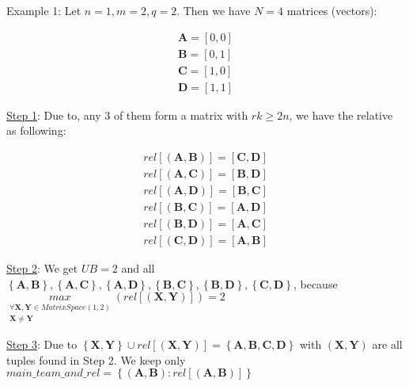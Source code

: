 Example 1: Let $n=1,m=2,q=2$. Then we have $N=4$ matrices (vectors):

\[
\begin{array}{c}
\boldsymbol{A}=[0,0]\\
\boldsymbol{B}=[0,1]\\
\boldsymbol{C}=[1,0]\\
\boldsymbol{D}=[1,1]
\end{array}
\]

\uline{Step 1}: Due to, any 3 of them form a matrix with $rk\geq2n$,
we have the relative as following:

\[
\begin{array}{c}
rel\left[\left(\boldsymbol{A},\boldsymbol{B}\right)\right]=[\boldsymbol{C},\boldsymbol{D}]\\
rel\left[\left(\boldsymbol{A},\boldsymbol{C}\right)\right]=[\boldsymbol{B},\boldsymbol{D}]\\
rel\left[\left(\boldsymbol{A},\boldsymbol{D}\right)\right]=[\boldsymbol{B},\boldsymbol{C}]\\
rel\left[\left(\boldsymbol{B},\boldsymbol{C}\right)\right]=[\boldsymbol{A},\boldsymbol{D}]\\
rel\left[\left(\boldsymbol{B},\boldsymbol{D}\right)\right]=[\boldsymbol{A},\boldsymbol{C}]\\
rel\left[\left(\boldsymbol{C},\boldsymbol{D}\right)\right]=[\boldsymbol{A},\boldsymbol{B}]
\end{array}
\]

\uline{Step 2}: We get $UB=2$ and all $\left\{ \boldsymbol{A},\boldsymbol{B}\right\} ,\left\{ \boldsymbol{A},\boldsymbol{C}\right\} ,\left\{ \boldsymbol{A},\boldsymbol{D}\right\} ,\left\{ \boldsymbol{B},\boldsymbol{C}\right\} ,\left\{ \boldsymbol{B},\boldsymbol{D}\right\} ,\left\{ \boldsymbol{C},\boldsymbol{D}\right\} $,
because $\underset{\begin{array}{c}
\forall\boldsymbol{X},\boldsymbol{Y}\in MatrixSpace(1,2)\\
\boldsymbol{X}\neq\boldsymbol{Y}
\end{array}}{max}\left(rel\left[\left(\boldsymbol{X},\boldsymbol{Y}\right)\right]\right)=2$

\uline{Step 3}: Due to $\left\{ \boldsymbol{X},\boldsymbol{Y}\right\} \cup rel\left[\left(\boldsymbol{X},\boldsymbol{Y}\right)\right]=\left\{ \boldsymbol{A},\boldsymbol{B},\boldsymbol{C},\boldsymbol{D}\right\} $
with $\left(\boldsymbol{X},\boldsymbol{Y}\right)$ are all tuples
found in Step 2. We keep only $main\_team\_and\_rel=\left\{ \left(\boldsymbol{A},\boldsymbol{B}\right):rel\left[\left(\boldsymbol{A},\boldsymbol{B}\right)\right]\right\} $

